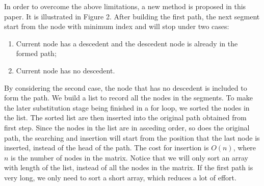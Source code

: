 \documentclass[conference]{IEEEtran}
\begin{document}
In order to overcome the above limitations, a new method is proposed in this paper. It is illustrated in Figure 2.
After building the first path, the next segment start from the node with minimum index and will stop under two cases: 
\begin{enumerate}[1)]
\item Current node has a descedent and the descedent node is already in the formed path; 
\item Current node has no descedent.
\end{enumerate} 
By considering the second case, the node that has no descedent is included to form the path. We build a list to record all the nodes in 
the segments. To make the later substitution stage being finished in a for loop, we sorted the nodes in the list. The sorted list are then
inserted into the original path obtained from first step. Since the nodes in the list are in asceding order, so does the original path, 
the searching and insertion will start from the position that the last node is inserted, instead of the head of the path. The cost for
insertion is $O(n)$, where $n$ is the number of nodes in the matrix. Notice that we will only sort an array with length of the list, 
instead of all the nodes in the matrix. If the first path is very long, we only need to sort a short array, which reduces a lot of effort.
\end{document}
